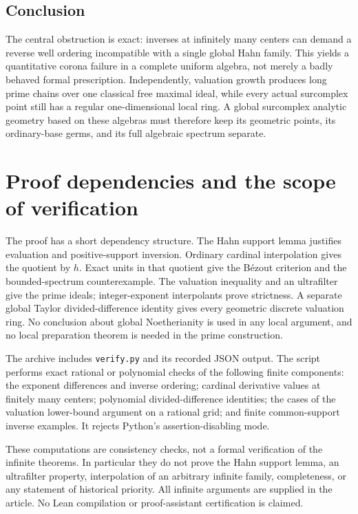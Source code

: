 \documentclass[11pt,letterpaper]{article}
\numberwithin{equation}{section}
\theoremstyle{definition}
\theoremstyle{remark}
\begin{document}
\subsection{Conclusion}
The central obstruction is exact: inverses at infinitely many centers
can demand a reverse well ordering incompatible with a single global
Hahn family. This yields a quantitative corona failure in a complete
uniform algebra, not merely a badly behaved formal prescription.
Independently, valuation growth produces long prime chains over one
classical free maximal ideal, while every actual surcomplex point still
has a regular one-dimensional local ring. A global surcomplex analytic
geometry based on these algebras must therefore keep its geometric
points, its ordinary-base germs, and its full algebraic spectrum
separate.

\appendix
\section{Proof dependencies and the scope of verification}
\label{app:audit}
The proof has a short dependency structure. The Hahn support lemma
justifies evaluation and positive-support inversion. Ordinary cardinal
interpolation gives the quotient by $h$. Exact units in that quotient
give the B\'ezout criterion and the bounded-spectrum counterexample.
The valuation inequality and an ultrafilter give the prime ideals;
integer-exponent interpolants prove strictness. A separate global
Taylor divided-difference identity gives every geometric discrete
valuation ring. No conclusion about global Noetherianity is used in
any local argument, and no local preparation theorem is needed in the
prime construction.

The archive includes \texttt{verify.py} and its recorded JSON output.
The script performs exact rational or polynomial checks of the
following finite components: the exponent differences and inverse
ordering; cardinal derivative values at finitely many centers;
polynomial divided-difference identities; the cases of the valuation
lower-bound argument on a rational grid; and finite common-support
inverse examples. It rejects Python's assertion-disabling mode.

These computations are consistency checks, not a formal verification of
the infinite theorems. In particular they do not prove the Hahn support
lemma, an ultrafilter property, interpolation of an arbitrary infinite
family, completeness, or any statement of historical priority. All
infinite arguments are supplied in the article. No Lean compilation or
proof-assistant certification is claimed.
\end{document}
